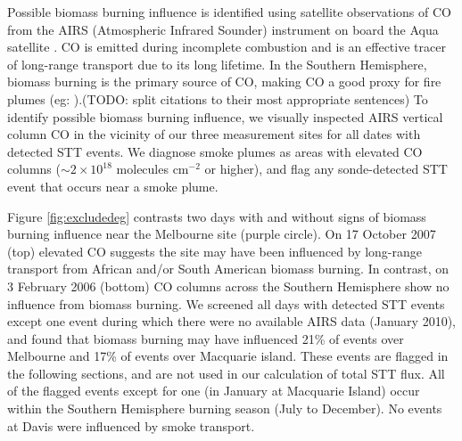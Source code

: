 \documentclass{article}
\begin{document}
    
    Possible biomass burning influence is identified using satellite observations of CO from the AIRS (Atmospheric Infrared Sounder) instrument on board the Aqua satellite \citep{AIRS3STD}.
    CO is emitted during incomplete combustion and is an effective tracer of long-range transport due to its long lifetime.
    In the Southern Hemisphere, biomass burning is the primary source of CO, making CO a good proxy for fire plumes (eg: \citet{Edwards2003,Sinha2004,Edwards2006,Mari2008}).(TODO: split citations to their most appropriate sentences)
    To identify possible biomass burning influence, we visually inspected AIRS vertical column CO in the vicinity of our three measurement sites for all dates with detected STT events.
    We diagnose smoke plumes as areas with elevated CO columns ($\sim 2 \times 10^{18}$ molecules cm$^{-2}$ or higher), and flag any sonde-detected STT event that occurs near a smoke plume.

    Figure \ref{fig:excludedeg} contrasts two days with and without signs of biomass burning influence near the Melbourne site (purple circle).
    On 17 October 2007 (top) elevated CO suggests the site may have been influenced by long-range transport from African and/or South American biomass burning.
    In contrast, on 3 February 2006 (bottom) CO columns across the Southern Hemisphere show no influence from biomass burning.
    We screened all days with detected STT events except one event during which there were no available AIRS data (January 2010), and found that biomass burning may have influenced 21\% of events over Melbourne and 17\% of events over Macquarie island.
    These events are flagged in the following sections, and are not used in our calculation of total STT flux.
    All of the flagged events except for one (in January at Macquarie Island) occur within the Southern Hemisphere burning season (July to December). %
    No events at Davis were influenced by smoke transport.
    
\end{document}

